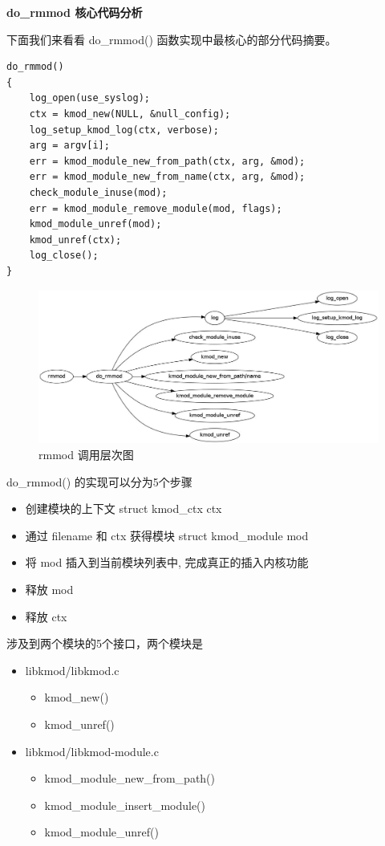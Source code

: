 \documentclass[11pt,a4paper]{article}
\makeatletter
\def\maxwidth{\ifdim\Gin@nat@width>\linewidth\linewidth
\else\Gin@nat@width\fi}
\let\Oldincludegraphics\includegraphics
\renewcommand{\includegraphics}[1]{\Oldincludegraphics[width=\maxwidth]{#1}}
\makeatother
\begin{document}
\textbf{do\_rmmod 核心代码分析}

下面我们来看看 do\_rmmod() 函数实现中最核心的部分代码摘要。

{\begin{shaded}\begin{verbatim}
do_rmmod()
{
    log_open(use_syslog);
    ctx = kmod_new(NULL, &null_config);
    log_setup_kmod_log(ctx, verbose);
    arg = argv[i];
    err = kmod_module_new_from_path(ctx, arg, &mod);
    err = kmod_module_new_from_name(ctx, arg, &mod);
    check_module_inuse(mod);
    err = kmod_module_remove_module(mod, flags);
    kmod_module_unref(mod);
    kmod_unref(ctx);
    log_close();
}
\end{verbatim}\end{shaded}}
\begin{figure}[htbp]
\centering
\includegraphics{./figures/rmmod.jpg}
\caption{rmmod 调用层次图}
\end{figure}

do\_rmmod() 的实现可以分为5个步骤

\begin{itemize}
\item
  创建模块的上下文 struct kmod\_ctx ctx
\item
  通过 filename 和 ctx 获得模块 struct kmod\_module mod
\item
  将 mod 插入到当前模块列表中, 完成真正的插入内核功能
\item
  释放 mod
\item
  释放 ctx
\end{itemize}
涉及到两个模块的5个接口，两个模块是

\begin{itemize}
\item
  libkmod/libkmod.c
  \begin{itemize}
  \item
    kmod\_new()
  \item
    kmod\_unref()
  \end{itemize}
\item
  libkmod/libkmod-module.c
  \begin{itemize}
  \item
    kmod\_module\_new\_from\_path()
  \item
    kmod\_module\_insert\_module()
  \item
    kmod\_module\_unref()
  \end{itemize}
\end{itemize}
\end{document}
